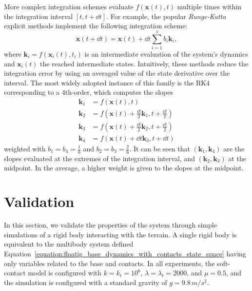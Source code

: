 More complex integration schemes evaluate $f\left(\mathbf{x}(t), t\right)$ multiple times within the integration interval $[t, t+\dd{t}]$.
For example, the popular \emph{Runge-Kutta} explicit methods implement the following integration scheme:
%
\begin{equation*}
    \mathbf{x}(t + \dd{t}) = \mathbf{x}(t) + \dd{t} \sum_{i=1}^{s} b_i \mathbf{k}_i
    ,
\end{equation*}
%
where $\mathbf{k}_i = f\left(\mathbf{x}_i(t), t_i\right)$ is an intermediate evaluation of the system's dynamics and $\mathbf{x}_i(t)$ the reached intermediate states.
Intuitively, these methods reduce the integration error by using an averaged value of the state derivative over the interval.
The most widely adopted instance of this family is the \ac{RK4} corresponding to a $4$th-order, which computes the slopes
%
\begin{align*}
    \mathbf{k}_1 &= f\left(\mathbf{x}(t), t\right) \\
    \mathbf{k}_2 &= f\left(\mathbf{x}(t) + \frac{\dd{t}}{2} \mathbf{k}_1, t + \frac{\dd{t}}{2}\right) \\
    \mathbf{k}_3 &= f\left(\mathbf{x}(t) + \frac{\dd{t}}{2} \mathbf{k}_2, t + \frac{\dd{t}}{2}\right) \\
    \mathbf{k}_4 &= f\left(\mathbf{x}(t) + \dd{t} \mathbf{k}_3, t + \dd{t}\right)
\end{align*}
%
weighted with $b_1 = b_4 = \frac{1}{6}$ and $b_2 = b_3 = \frac{2}{6}$.
It can be seen that $(\mathbf{k}_1, \mathbf{k}_4)$ are the slopes evaluated at the extremes of the integration interval, and $(\mathbf{k}_2, \mathbf{k}_3)$ at the midpoint.
In the average, a higher weight is given to the slopes at the midpoint.

\newpage
\section{Validation}

In this section, we validate the properties of the system through simple simulations of a rigid body interacting with the terrain.
A single rigid body is equivalent to the multibody system defined Equation~\eqref{equation:floatig_base_dynamics_with_contacts_state_space} having only variables related to the base and contacts.
In all experiments, the soft-contact model is configured with $k = k_t = 10^6$, $\lambda = \lambda_t = 2000$, and $\mu=0.5$, and the simulation is configured with a standard gravity of $g = 9.8 \, m/s^2$.

